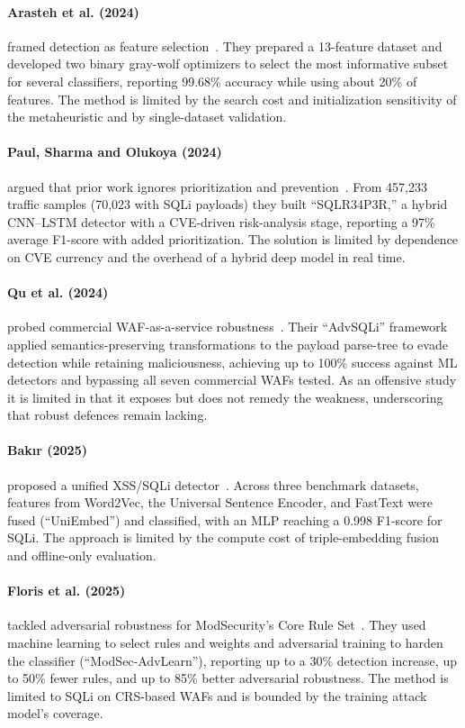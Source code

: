 \documentclass[pdflatex,sn-mathphys-num]{sn-jnl}
\begin{document}
\paragraph{Arasteh et al. (2024)}
framed detection as feature selection~\cite{arasteh2024graywolf}. They prepared a
13-feature dataset and developed two binary gray-wolf optimizers to select the most
informative subset for several classifiers, reporting 99.68\% accuracy while using
about 20\% of features. The method is limited by the search cost and initialization
sensitivity of the metaheuristic and by single-dataset validation.

\paragraph{Paul, Sharma and Olukoya (2024)}
argued that prior work ignores prioritization and prevention~\cite{paul2024sqlreaper}.
From 457{,}233 traffic samples (70{,}023 with SQLi payloads) they built
``SQLR34P3R,'' a hybrid CNN--LSTM detector with a CVE-driven risk-analysis stage,
reporting a 97\% average F1-score with added prioritization. The solution is limited
by dependence on CVE currency and the overhead of a hybrid deep model in real time.

\paragraph{Qu et al. (2024)}
probed commercial WAF-as-a-service robustness~\cite{qu2024advsqli}. Their
``AdvSQLi'' framework applied semantics-preserving transformations to the payload
parse-tree to evade detection while retaining maliciousness, achieving up to 100\%
success against ML detectors and bypassing all seven commercial WAFs tested. As an
offensive study it is limited in that it exposes but does not remedy the weakness,
underscoring that robust defences remain lacking.

\paragraph{Bak\i r (2025)}
proposed a unified XSS/SQLi detector~\cite{bakir2025uniembed}. Across three benchmark
datasets, features from Word2Vec, the Universal Sentence Encoder, and FastText were
fused (``UniEmbed'') and classified, with an MLP reaching a 0.998 F1-score for SQLi.
The approach is limited by the compute cost of triple-embedding fusion and offline-only
evaluation.

\paragraph{Floris et al. (2025)}
tackled adversarial robustness for ModSecurity's Core Rule
Set~\cite{floris2025modsec}. They used machine learning to select rules and weights
and adversarial training to harden the classifier (``ModSec-AdvLearn''), reporting up
to a 30\% detection increase, up to 50\% fewer rules, and up to 85\% better adversarial
robustness. The method is limited to SQLi on CRS-based WAFs and is bounded by the
training attack model's coverage.
\end{document}
